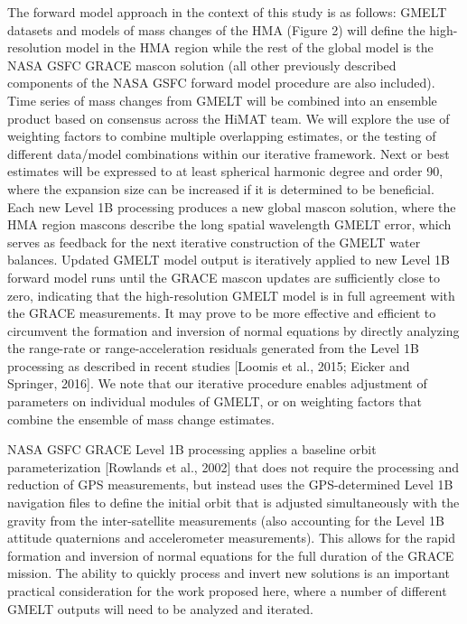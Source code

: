 \documentclass[review]{igs}
\begin{document}
The forward model approach in the context of this study is as follows: GMELT datasets and models of mass changes of the HMA (Figure 2) will define the high-resolution model in the HMA region while the rest of the global model is the NASA GSFC GRACE mascon solution (all other previously described components of the NASA GSFC forward model procedure are also included). Time series of mass changes from GMELT will be combined into an ensemble product based on consensus across the HiMAT team. We will explore the use of weighting factors to combine multiple overlapping estimates, or the testing of different data/model combinations
within our iterative framework. Next or best estimates will be expressed to at least spherical harmonic degree and order 90, where the expansion size can be increased if it is determined to be beneficial. Each new Level 1B processing produces a new global mascon solution, where the HMA region mascons describe the long spatial wavelength GMELT error, which serves as feedback for the next iterative construction of the GMELT water balances. Updated GMELT model output is iteratively applied to new Level 1B forward model runs until the GRACE mascon updates are sufficiently close to zero, indicating that the high-resolution GMELT model is in full
agreement with the GRACE measurements. It may prove to be more effective and efficient to circumvent the formation and inversion of normal equations by directly analyzing the range-rate or range-acceleration residuals generated from the Level 1B processing as described in recent studies [Loomis et al., 2015; Eicker and Springer, 2016]. We note that our iterative procedure enables adjustment of parameters on individual modules of GMELT, or on weighting factors that combine the ensemble of mass change estimates.

NASA GSFC GRACE Level 1B processing applies a baseline orbit parameterization [Rowlands et al., 2002] that does not require the processing and reduction of GPS measurements, but instead uses the GPS-determined Level 1B navigation files to define the initial orbit that is adjusted simultaneously with the gravity from the inter-satellite measurements (also accounting for the Level 1B attitude quaternions and accelerometer measurements). This allows for the rapid formation and inversion of normal equations for the full duration of the GRACE mission. The ability to quickly process and invert new solutions is an important practical
consideration for the work proposed here, where a number of different GMELT outputs will need to be analyzed and iterated.
\end{document}
